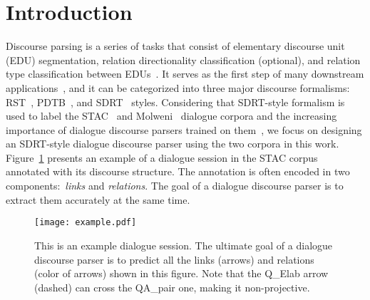 \documentclass[11pt]{article}
\begin{document}
\section{Introduction}
Discourse parsing is a series of tasks that consist of elementary discourse unit (EDU) segmentation, relation directionality classification (optional), and relation type classification between EDUs~\cite{jurafsky_martin_2021}. It serves as the first step of many downstream applications~\cite{meyer2012using, jansen2014discourse,narasimhan2015machine,bhatia2015better,ji2016latent,asher2016discourse, ji2017neural, li2020molweni},
and it can be categorized into three major discourse formalisms: RST~\cite{mann1988rhetorical}, PDTB~\cite{prasad2008penn}, and SDRT~\cite{lascarides2008segmented} styles.
Considering that SDRT-style formalism is used to label the STAC~\cite{asher2016discourse} and Molweni~\cite{li2020molweni} dialogue corpora and the increasing importance of dialogue discourse parsers trained on them~\cite{ouyang2020dialogue,feng2020dialogue,jia2020multi,chen2021structure}, we focus on designing an SDRT-style dialogue discourse parser using the two corpora in this work.
Figure~\ref{fig:task} presents an example of a dialogue session in the STAC corpus~\cite{asher2016discourse} annotated with its discourse structure.
The annotation is often encoded in two components:~\emph{links} and \emph{relations}. The goal of a dialogue discourse parser is to extract them accurately at the same time.
\begin{figure}[]
\hspace{1em}\texttt{[image: example.pdf]}
\caption{This is an example dialogue session. The ultimate goal of a dialogue discourse parser is to predict all the links (arrows) and relations (color of arrows) shown in this figure. Note that the Q\_Elab arrow (dashed) can cross the QA\_pair one, making it non-projective.}
\label{fig:task}
\vspace{-3mm}
\end{figure}
\end{document}
